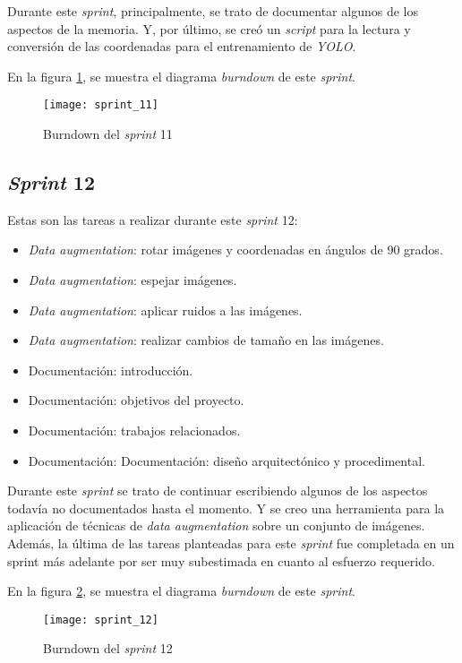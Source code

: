 Durante este \textit{sprint}, principalmente, se trato de documentar algunos de los aspectos de la memoria. Y, por último, se creó un \textit{script} para la lectura y conversión de las coordenadas para el entrenamiento de \textit{YOLO}.

En la figura \ref{fig:A.1.12}, se muestra el diagrama \textit{burndown} de este \textit{sprint}.

\begin{figure}
\centering
\texttt{[image: sprint\_11]}
\caption{Burndown del \textit{sprint} 11}
\label{fig:A.1.12}
\end{figure}

\subsection{\textit{Sprint} 12}

Estas son las tareas a realizar durante este \textit{sprint} 12:

\begin{itemize}
	\item \textit{Data augmentation}: rotar imágenes y coordenadas en ángulos de 90 grados.
	\item \textit{Data augmentation}: espejar imágenes.
	\item \textit{Data augmentation}: aplicar ruidos a las imágenes.
	\item \textit{Data augmentation}: realizar cambios de tamaño en las imágenes.
	\item Documentación: introducción.
	\item Documentación: objetivos del proyecto.
	\item Documentación: trabajos relacionados.
	\item Documentación: Documentación: diseño arquitectónico y procedimental.
\end{itemize}

Durante este \textit{sprint} se trato de continuar escribiendo algunos de los aspectos todavía no documentados hasta el momento. Y se creo una herramienta para la aplicación de técnicas de \textit{data augmentation} sobre un conjunto de imágenes. Además, la última de las tareas planteadas para este \textit{sprint} fue completada en un sprint más adelante por ser muy subestimada en cuanto al esfuerzo requerido.

En la figura \ref{fig:A.1.13}, se muestra el diagrama \textit{burndown} de este \textit{sprint}.

\begin{figure}
\centering
\texttt{[image: sprint\_12]}
\caption{Burndown del \textit{sprint} 12}
\label{fig:A.1.13}
\end{figure}

